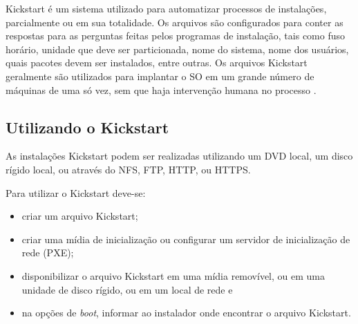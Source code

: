 Kickstart é um sistema utilizado para automatizar processos de instalações, parcialmente ou em sua totalidade. Os arquivos são configurados para conter as respostas para as perguntas feitas pelos programas de instalação, tais como fuso horário, unidade que deve ser particionada, nome do sistema, nome dos usuários, quais pacotes devem ser instalados, entre outras. Os arquivos Kickstart geralmente são utilizados para implantar o SO em um grande número de máquinas de uma só vez, sem que haja intervenção humana no processo \cite{Fedora}.

\subsection{Utilizando o Kickstart}

As instalações Kickstart podem ser realizadas utilizando um DVD local, um disco rígido local, ou através do NFS, FTP, HTTP, ou HTTPS.

Para utilizar o Kickstart deve-se:
\begin{itemize}
\item criar um arquivo Kickstart;
\item criar uma mídia de inicialização ou configurar um servidor de inicialização de rede (PXE);
\item disponibilizar o arquivo Kickstart em uma mídia removível, ou em uma unidade de disco rígido, ou em um local de rede e
\item na opções de \textit{boot}, informar ao instalador onde encontrar o arquivo Kickstart.
\end{itemize}




